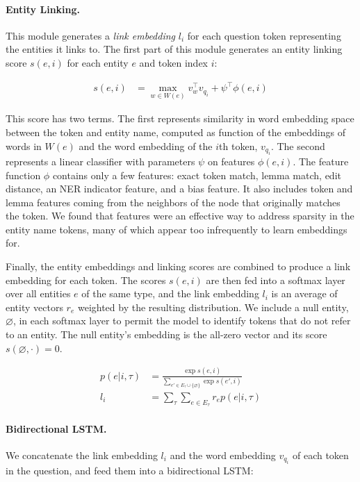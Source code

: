\paragraph{Entity Linking.}
This module generates a \emph{link embedding} $l_{i}$ for each question token 
representing the entities it links to.
The first part of this module generates an entity linking score $s(e,i)$ 
for each entity $e$ and token index $i$:

\begin{align}
s(e,i) & = \max_{w \in W(e)} v_w^\intercal v_{q_i} + \psi^\intercal \phi(e,i)
\end{align}

This score has two terms. The first represents similarity in word embedding 
space between the token and entity name, computed as function of the embeddings 
of words in $W(e)$ and the word embedding of the $i$th token, $v_{q_i}$. The 
second represents a linear classifier with parameters $\psi$ on features 
$\phi(e,i)$.
The feature function $\phi$ contains only a few features: exact token match, 
lemma match, edit distance, an NER indicator feature, and a bias feature.
It also includes token and lemma features coming from the neighbors of the node
that originally matches the token. We found that features were an effective way
to address sparsity in the entity name tokens, many of which appear too 
infrequently
to learn embeddings for.

Finally, the entity embeddings and linking scores are combined to produce a 
link embedding for each token.
The scores $s(e,i)$ are then fed into a softmax layer over all entities $e$ of 
the same type, and the link embedding $l_{i}$ is an average of entity vectors 
$r_e$ weighted by the resulting distribution.
We include a null entity, $\varnothing$, in each softmax layer to permit the 
model to identify tokens that do not refer to an entity. The null entity's 
embedding is the all-zero vector and its score $s(\varnothing, \cdot) = 0$.

\begin{align}
p(e | i, \tau) & = \frac{\exp{s(e,i)}}{\sum_{e'\in E_\tau \cup \{\varnothing\}} 
\exp{s(e',i)}} \\
l_{i} & = \sum_\tau \sum_{e \in E_\tau} r_e p(e | i, \tau)
\end{align}

\paragraph{Bidirectional LSTM.}
We concatenate the link embedding $l_i$ and the word embedding $v_{q_i}$ of 
each token in the question, and feed them into a bidirectional LSTM:

